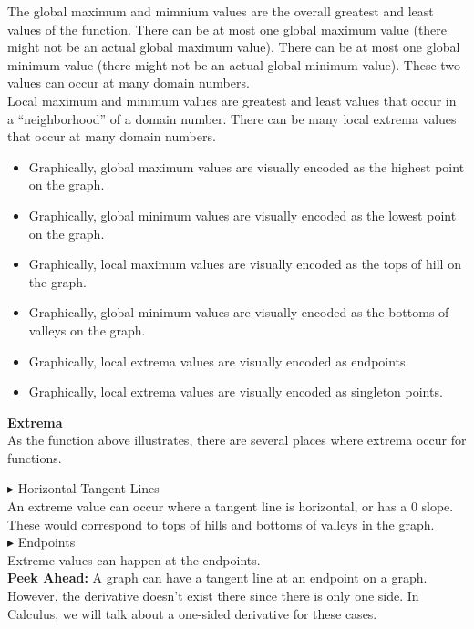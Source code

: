 \documentclass{ximera}
\begin{document}
The global maximum and mimnium values are the overall greatest and least values of the function.  There can be at most one global maximum value (there might not be an actual global maximum value). There can be at most one global minimum value (there might not be an actual global minimum value).  These two values can occur at many domain numbers.\\


Local maximum and minimum values are greatest and least values that occur in a ``neighborhood'' of a domain number.  There can be many local extrema values that occur at many domain numbers. \\


\begin{itemize}
\item Graphically, global maximum values are visually encoded as the highest point on the graph.
\item Graphically, global minimum values are visually encoded as the lowest point on the graph.
\item Graphically, local maximum values are visually encoded as the tops of hill on the graph.
\item Graphically, global minimum values are visually encoded as the bottoms of valleys on the graph.
\end{itemize}


\begin{itemize}
\item Graphically, local extrema values are visually encoded as endpoints.
\item Graphically, local extrema values are visually encoded as singleton points.
\end{itemize}



\begin{template} \textbf{\textcolor{blue!55!black}{Extrema}} \\

As the function above illustrates, there are several places where extrema occur for functions.


\textbf{\textcolor{red!90!darkgray}{$\blacktriangleright$}} Horizontal Tangent Lines \\

An extreme value can occur where a tangent line is horizontal, or has a $0$ slope.  These would correspond to tops of hills and bottoms of valleys in the graph. \\




\textbf{\textcolor{red!90!darkgray}{$\blacktriangleright$}} Endpoints \\

Extreme values can happen at the endpoints. \\

\textbf{Peek Ahead:} A graph can have a tangent line at an endpoint on a graph.  However, the derivative doesn't exist there since there is only one side.  In Calculus, we will talk about a one-sided derivative for these cases. \\

\end{template}
\end{document}
